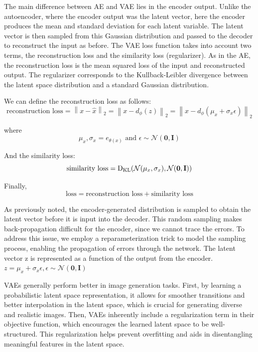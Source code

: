 \documentclass{article}
\begin{document}
The main difference between AE and VAE lies in the encoder output. Unlike the autoencoder, where the encoder output was the latent vector, here the encoder produces the mean and standard deviation for each latent variable. 
The latent vector is then sampled from this Gaussian distribution and passed to the decoder to reconstruct the input as before.
The VAE loss function takes into account two terms, the reconstruction loss and the similarity loss (regularizer). 
As in the AE, the reconstruction loss is the mean squared loss of the input and reconstructed output. 
The regularizer corresponds to the Kullback-Leibler divergence between the latent space distribution and a standard Gaussian distribution.
  
We can define the reconstruction loss as follows:
$$\text{reconstruction loss} = \left\| x -\hat{x}\right\|_{2}=\left\| x-d_{\phi}(z) \right\|_{2}=\left\| x-d_{\phi}(\mu_{x}+\sigma_{x}\epsilon) \right\|_{2}$$

where
$$\mu_{x},\sigma_{x}=e_{\theta(x)} \text{ and } \epsilon\sim\mathcal{N}(\textbf{0},\textbf{I})$$


And the similarity loss:
$$\text{similarity loss}=\mathrm{D}_{\mathrm{KL}}(\mathcal{N}(\mu_{x},\sigma_{x}), \mathcal{N}(\textbf{0},\textbf{I})) \\$$

Finally,
$$\text{loss}=\text{reconstruction loss}+\text{similarity loss}$$


As previously noted, the encoder-generated distribution is sampled to obtain the latent vector before it is input into the decoder. This random sampling makes back-propagation difficult for the encoder, since we cannot trace the errors. To address this issue, we employ a reparameterization trick to model the sampling process, enabling the propagation of errors through the network. The latent vector z is represented as a function of the output from the encoder.
$z=\mu_{x}+\sigma_{x}\epsilon, \epsilon\sim\mathcal{N}(\textbf{0},\textbf{I})$

VAEs generally perform better in image generation tasks. First, by learning a probabilistic latent space representation, it allows for smoother transitions and better interpolation in the latent space, which is crucial for generating diverse and realistic images. Then, VAEs inherently include a regularization term in their objective function, which encourages the learned latent space to be well-structured. This regularization helps prevent overfitting and aids in disentangling meaningful features in the latent space.
\end{document}
